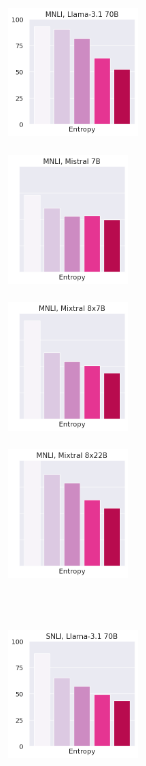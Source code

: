 \begin{figure}[t]
    \begin{subfigure}[b]{0.22\textwidth}
        \includegraphics[height=3.4cm]{figures/appendix/entropy_acc_mnli_matched_70B}
    \end{subfigure}
    \begin{subfigure}[b]{0.22\textwidth}
        \includegraphics[height=3.4cm]{figures/appendix/entropy_acc_mnli_matched_7B}
    \end{subfigure}
    \begin{subfigure}[b]{0.22\textwidth}
        \includegraphics[height=3.4cm]{figures/appendix/entropy_acc_mnli_matched_8x7B}
    \end{subfigure}
    \begin{subfigure}[b]{0.22\textwidth}
        \includegraphics[height=3.4cm]{figures/appendix/entropy_acc_mnli_matched_8x22B}
    \end{subfigure}\\
    \begin{subfigure}[b]{0.22\textwidth}
        \includegraphics[height=3.4cm]{figures/appendix/entropy_acc_snli_70B}

\end{subfigure}
\end{figure}

